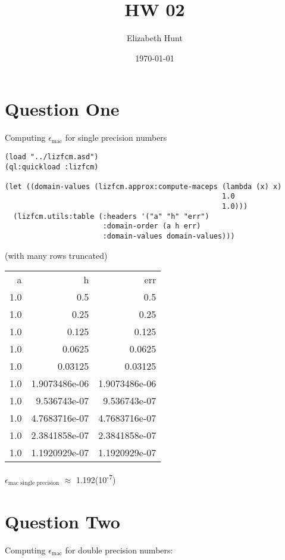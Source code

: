 \documentclass[11pt]{article}
\author{Elizabeth Hunt}
\date{\today}
\title{HW 02}
\begin{document}
\maketitle
\setlength\parindent{0pt}

\section{Question One}
\label{sec:orga21c813}
Computing \(\epsilon_{\text{mac}}\) for single precision numbers

\begin{verbatim}
(load "../lizfcm.asd")
(ql:quickload :lizfcm)

(let ((domain-values (lizfcm.approx:compute-maceps (lambda (x) x)
                                                   1.0
                                                   1.0)))
  (lizfcm.utils:table (:headers '("a" "h" "err")
                       :domain-order (a h err)
                       :domain-values domain-values)))
\end{verbatim}

(with many rows truncated)

\begin{center}
\begin{tabular}{rrr}
a & h & err\\[0pt]
1.0 & 0.5 & 0.5\\[0pt]
1.0 & 0.25 & 0.25\\[0pt]
1.0 & 0.125 & 0.125\\[0pt]
1.0 & 0.0625 & 0.0625\\[0pt]
1.0 & 0.03125 & 0.03125\\[0pt]
1.0 & 1.9073486e-06 & 1.9073486e-06\\[0pt]
1.0 & 9.536743e-07 & 9.536743e-07\\[0pt]
1.0 & 4.7683716e-07 & 4.7683716e-07\\[0pt]
1.0 & 2.3841858e-07 & 2.3841858e-07\\[0pt]
1.0 & 1.1920929e-07 & 1.1920929e-07\\[0pt]
\end{tabular}
\end{center}

\(\epsilon_{\text{mac single precision}}\) \(\approx\) 1.192(10\textsuperscript{-7})

\section{Question Two}
\label{sec:org06c4a23}
Computing \(\epsilon_{\text{mac}}\) for double precision numbers:
\end{document}
